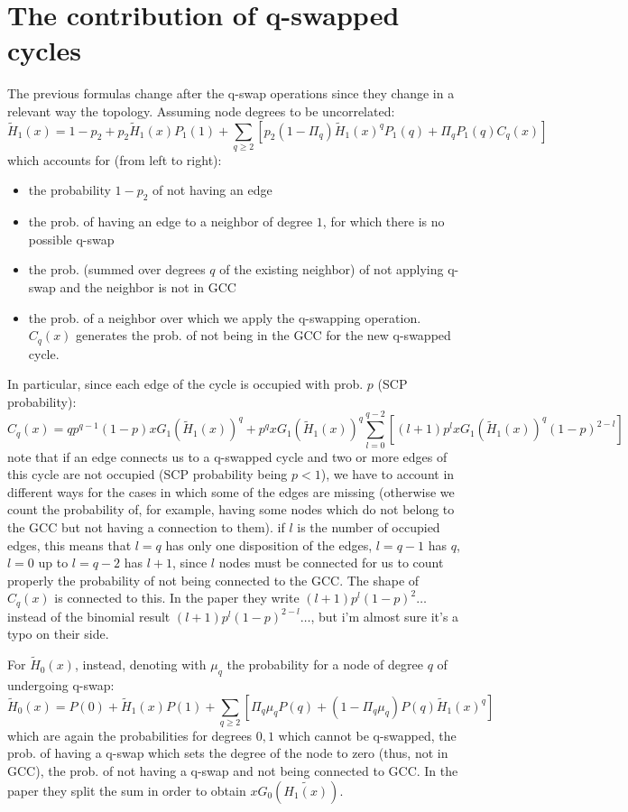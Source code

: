 \section{The contribution of q-swapped cycles}
The previous formulas change after the q-swap operations since they change in a relevant way the topology. Assuming node degrees to be uncorrelated:
\begin{equation}
    \tilde{H}_1(x) = 1-p_2 + p_2\tilde{H}_1(x)P_1(1) + \sum_{q\geq 2}\left[ p_2(1-\Pi_q) \tilde{H}_1(x)^q P_1(q) + \Pi_q P_1(q) C_q(x)\right]
\end{equation}
which accounts for (from left to right):
\begin{itemize}
    \item the probability $1-p_2$ of not having an edge
    \item the prob. of having an edge to a neighbor of degree $1$, for which there is no possible q-swap
    \item the prob. (summed over degrees $q$ of the existing neighbor) of not applying q-swap and the neighbor is not in GCC
    \item the prob. of a neighbor over which we apply the q-swapping operation. $C_q(x)$ generates the prob. of not being in the GCC for the new q-swapped cycle.
\end{itemize}
In particular, since each edge of the cycle is occupied with prob. $p$ (SCP probability):
\begin{equation}
    C_q(x) = qp^{q-1}(1-p)xG_1(\tilde{H}_1(x))^{q} + p^q xG_1(\tilde{H}_1(x))^{q} \sum_{l=0}^{q-2} \left[ (l + 1)p^l xG_1(\tilde{H}_1(x))^{q} (1-p)^{2-l} \right]
\end{equation}
note that if an edge connects us to a q-swapped cycle and two or more edges of this cycle are not occupied (SCP probability being $p < 1$), we have to account in different ways for the cases in which some of the edges are missing (otherwise we count the probability of, for example, having some nodes which do not belong to the GCC but not having a connection to them). if $l$ is the number of occupied edges, this means that $l=q$ has only one disposition of the edges, $l=q-1$ has $q$, $l = 0$ up to $l = q-2$ has $l+1$, since $l$ nodes must be connected for us to count properly the probability of not being connected to the GCC. The shape of $C_q(x)$ is connected to this. In the paper they write $(l+1)p^l(1-p)^2\dots$ instead of the binomial result $(l+1)p^l(1-p)^{2-l}\dots$, but i'm almost sure it's a typo on their side.

For $\tilde{H}_0(x)$, instead, denoting with $\mu_q$ the probability for a node of degree $q$ of undergoing q-swap:
\begin{equation}
    \tilde{H}_0(x) = P(0) + \tilde{H}_1(x)P(1) + \sum_{q\geq 2}\left[ \Pi_q \mu_q P(q) + (1 - \Pi_q \mu_q) P(q) \tilde{H}_1(x)^q\right]
\end{equation}
which are again the probabilities for degrees $0, 1$ which cannot be q-swapped, the prob. of having a q-swap which sets the degree of the node to zero (thus, not in GCC), the prob. of not having a q-swap and not being connected to GCC. In the paper they split the sum in order to obtain $xG_0(\tilde{H_1(x)})$.

\newpage